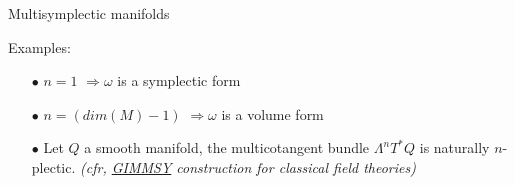 \documentclass[handout,10pt]{beamer}
\begin{document}
\begin{frame}[fragile]{Multisymplectic manifolds}
	\pause
	\vfill
	\begin{block}{Examples:}
		\vspace{-.5em}
		\begin{itemize}[<+->]
			\item[$\bullet$] $n=1$ \qquad\qquad\qquad $\Rightarrow$\quad $\omega$ is a symplectic form
			\item[$\bullet$]  $n=(dim(M)-1)$ \quad$\Rightarrow$\quad $\omega$ is a volume form
			\item[$\bullet$] Let $Q$ a smooth manifold, the multicotangent bundle $\Lambda^n T^\ast Q$ is naturally $n$-plectic.%
			\quad
			\textit{(cfr, \href{https://arxiv.org/abs/physics/9801019}{GIMMSY} construction for classical field theories)}
		\end{itemize}
	\end{block}			 
	
%
\end{frame}
\end{document}
